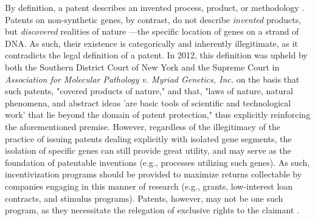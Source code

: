 \documentclass[12pt]{article}
\begin{document}
By definition, a patent describes an invented process, product, or
methodology \cite{patent_laws}. Patents on non-synthetic genes, by contrast, do
not describe \emph{invented} products, but \emph{discovered} realities of nature
---the specific location of genes on a strand of DNA. As such, their existence
is categorically and inherently illegitimate, as it contradicts the legal
definition of a patent. In 2012, this definition was upheld by both the
Southern District Court of New York and the Supreme Court in
\emph{Association for Molecular Pathology v. Myriad Genetics, Inc.} on the
basis that such patents, "covered products of nature," and that, "laws of
nature, natural phenomena, and abstract ideas 'are basic tools of scientific
and technological work' that lie beyond the domain of patent protection,"
\cite{ass_v_myriad} thus explicitly reinforcing the aforementioned premise.
However, regardless of the illegitimacy of the practice of issuing patents
dealing explicitly with isolated gene segments, the isolation of specific
genes can still provide great utility, and may serve as the foundation of
patentable inventions (e.g., processes utilizing such genes). As such,
incentivization programs should be provided to maximize returns collectable
by companies engaging in this manner of research (e.g., grants, low-interest
loan contracts, and stimulus programs). Patents, however, may not be one such
program, as they necessitate the relegation of exclusive rights to the claimant
.
\end{document}
